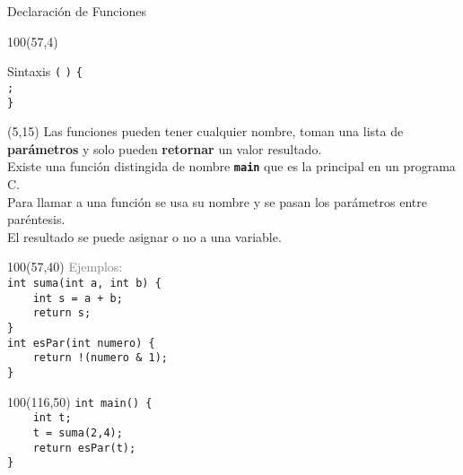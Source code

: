 \documentclass[aspectratio=169]{beamer}
\begin{document}
\begin{frame}[fragile,t]{Declaración de Funciones}
    \begin{textblock}{100}(57,4)
    \begin{block}{\small Sintaxis}
    \vspace{0.2cm}
    \scriptsize
     \hspace{0.2cm}  {\large \texttt{(}}  {\large \texttt{)}}
    {\large \texttt{\{}}\\ \vspace{0.2cm}
    \hspace{3.19cm}  {\large \texttt{;}}\\ \vspace{0.2cm}
    \hspace{2cm} {\large \texttt{\}}}
    \end{block}
    \end{textblock}
    \begin{textblock}{45}(5,15)
    Las funciones pueden tener cualquier nombre, toman una lista de \textbf{parámetros} y solo pueden \textbf{retornar} un valor resultado.\\
    \bigskip
    Existe una función distingida de nombre \textbf{\texttt{main}} que es la principal en un programa C.\\
    \bigskip
    Para llamar a una función se usa su nombre y se pasan los parámetros entre paréntesis.\\
    El resultado se puede asignar o no a una variable.\\
    \end{textblock}
    \begin{textblock}{100}(57,40)
    \textcolor{gray}{Ejemplos:}\\
    \bigskip
    \normalsize \verb|int suma(int a, int b) {|\\
    \normalsize \verb|    int s = a + b;|\\
    \normalsize \verb|    return s;|\\
    \normalsize \verb|}|\\
    \bigskip
    \normalsize \verb|int esPar(int numero) {|\\
    \normalsize \verb|    return !(numero & 1);|\\
    \normalsize \verb|}|\\
    \end{textblock}
    \begin{textblock}{100}(116,50)
    \normalsize \verb|int main() {|\\
    \normalsize \verb|    int t;|\\
    \normalsize \verb|    t = suma(2,4);|\\
    \normalsize \verb|    return esPar(t);|\\
    \normalsize \verb|}|\\
    \end{textblock}
\end{frame}
\end{document}
